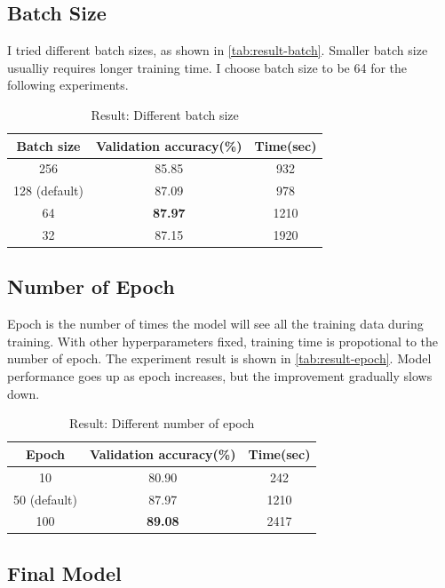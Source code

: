 \documentclass[10pt]{article}
\begin{document}
\subsection{Batch Size}

I tried different batch sizes, as shown in \autoref{tab:result-batch}. Smaller batch size usualliy requires longer training time. I choose batch size to be 64 for the following experiments.

\begin{table}[htb]
\centering
\caption{Result: Different batch size}
\begin{tabular}{c|c|c}
\hline
\textbf{Batch size}   & \textbf{Validation accuracy(\%)}   & \textbf{Time(sec)}   \\ \hline
256 & 85.85 & 932 \\
128  (default)    & 87.09    & 978        \\
64 & \textbf{87.97} & 1210 \\
32 & 87.15 & 1920 \\
\hline
\end{tabular}
\label{tab:result-batch}
\end{table}

\subsection{Number of Epoch}

Epoch is the number of times the model will see all the training data during training.
With other hyperparameters fixed, training time is propotional to the number of epoch. The experiment result is shown in \autoref{tab:result-epoch}. Model performance goes up as epoch increases, but the improvement gradually slows down.

\begin{table}[htb]
\centering
\caption{Result: Different number of epoch}
\begin{tabular}{c|c|c}
\hline
\textbf{Epoch}   & \textbf{Validation accuracy(\%)}   & \textbf{Time(sec)}   \\ \hline
10 & 80.90 & 242 \\
50  (default)    & 87.97    & 1210        \\
100 & \textbf{89.08} & 2417 \\
\hline
\end{tabular}
\label{tab:result-epoch}
\end{table}


\subsection{Final Model}
\end{document}
